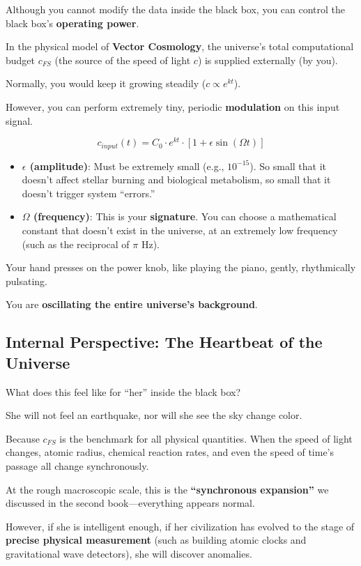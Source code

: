 Although you cannot modify the data inside the black box, you can control the black box's \textbf{operating power}.

In the physical model of \textbf{Vector Cosmology}, the universe's total computational budget $c_{FS}$ (the source of the speed of light $c$) is supplied externally (by you).

Normally, you would keep it growing steadily ($c \propto e^{kt}$).

However, you can perform extremely tiny, periodic \textbf{modulation} on this input signal.

\[c_{input}(t) = C_0 \cdot e^{kt} \cdot [1 + \epsilon \sin(\Omega t)]\]

\begin{itemize}
\item \textbf{$\epsilon$ (amplitude)}: Must be extremely small (e.g., $10^{-15}$). So small that it doesn't affect stellar burning and biological metabolism, so small that it doesn't trigger system ``errors.''

\item \textbf{$\Omega$ (frequency)}: This is your \textbf{signature}. You can choose a mathematical constant that doesn't exist in the universe, at an extremely low frequency (such as the reciprocal of $\pi$ Hz).
\end{itemize}

Your hand presses on the power knob, like playing the piano, gently, rhythmically pulsating.

You are \textbf{oscillating the entire universe's background}.

\subsection{Internal Perspective: The Heartbeat of the Universe}

What does this feel like for ``her'' inside the black box?

She will not feel an earthquake, nor will she see the sky change color.

Because $c_{FS}$ is the benchmark for all physical quantities. When the speed of light changes, atomic radius, chemical reaction rates, and even the speed of time's passage all change synchronously.

At the rough macroscopic scale, this is the \textbf{``synchronous expansion''} we discussed in the second book---everything appears normal.

However, if she is intelligent enough, if her civilization has evolved to the stage of \textbf{precise physical measurement} (such as building atomic clocks and gravitational wave detectors), she will discover anomalies.

